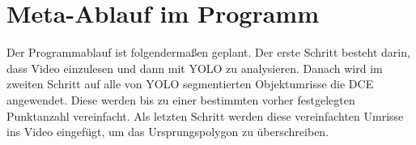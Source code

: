 	\section{Meta-Ablauf im Programm}{
	Der Programmablauf ist folgendermaßen geplant. Der erste Schritt besteht darin, dass Video einzulesen und dann mit YOLO zu analysieren. Danach wird im zweiten Schritt auf alle von YOLO segmentierten Objektumrisse die DCE angewendet. Diese werden bis zu einer bestimmten vorher festgelegten Punktanzahl vereinfacht. Als letzten Schritt werden diese vereinfachten Umrisse ins Video eingefügt, um das Ursprungspolygon zu überschreiben.
}




